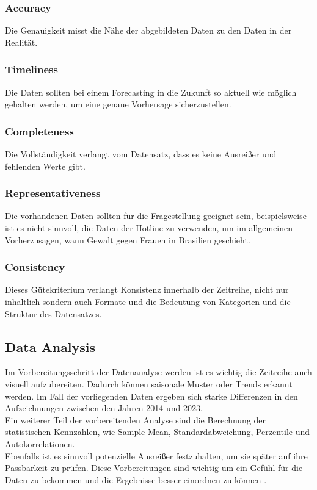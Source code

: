\documentclass[12pt]{report}
\begin{document}
	\subsubsection{Accuracy}
	Die Genauigkeit misst die Nähe der abgebildeten Daten zu den Daten in der Realität. 
	\subsubsection{Timeliness}
	Die Daten sollten bei einem Forecasting in die Zukunft so aktuell wie möglich gehalten werden, um eine genaue Vorhersage sicherzustellen. 
	\subsubsection{Completeness}
	Die Vollständigkeit verlangt vom Datensatz, dass es keine Ausreißer und fehlenden Werte gibt. 
	\subsubsection{Representativeness}
	Die vorhandenen Daten sollten für die Fragestellung geeignet sein, beispielsweise ist es nicht sinnvoll, die Daten der Hotline zu verwenden, um im allgemeinen Vorherzusagen, wann Gewalt gegen Frauen in Brasilien geschieht.
	\subsubsection{Consistency}
	Dieses Gütekriterium verlangt Konsistenz innerhalb der Zeitreihe, nicht nur inhaltlich sondern auch Formate und die Bedeutung von Kategorien und die Struktur des Datensatzes.
	
	\subsection{Data Analysis}
	Im Vorbereitungsschritt der Datenanalyse werden ist es wichtig die Zeitreihe auch visuell aufzubereiten. Dadurch können saisonale Muster oder Trends erkannt werden\cite[14f.]{Montgomery.2015}. 
	Im Fall der vorliegenden Daten ergeben  sich starke Differenzen in den Aufzeichnungen zwischen den Jahren 2014 und 2023.\\
	Ein weiterer Teil der vorbereitenden Analyse sind die Berechnung der statistischen Kennzahlen, wie Sample Mean, Standardabweichung, Perzentile und Autokorrelationen.\\ %
	Ebenfalls ist es sinnvoll potenzielle Ausreißer festzuhalten, um sie später auf ihre Passbarkeit zu prüfen. Diese Vorbereitungen sind wichtig um ein Gefühl für die Daten zu bekommen und die Ergebnisse besser einordnen zu können \cite[15]{Montgomery.2015}.\\
	
\end{document}
